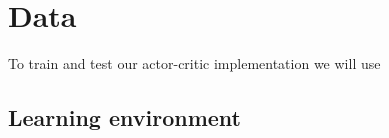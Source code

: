 \documentclass[11pt]{article}
\begin{document}
\maketitle

\section{Data}

To train and test our actor-critic implementation we will use


\subsection{Learning environment}




%
%
\end{document}
